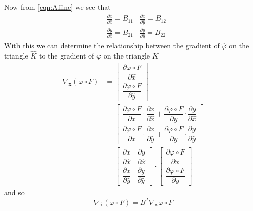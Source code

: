Now from \eqref{eqn:Affine} we see that 
\begin{align*}
  &\frac{\partial x}{\partial \hat{x}} = B_{11}   &\frac{\partial x}{\partial \hat{y}} = B_{12} \\
  &\frac{\partial y}{\partial \hat{x}} = B_{21}   &\frac{\partial y}{\partial \hat{y}} = B_{22}
\end{align*}
With this we can determine the relationship between the gradient of $\hat{\varphi}$ on the
triangle $\hat{K}$ to the gradient of $\varphi$ on the triangle $K$
\begin{align*}
  \nabla_{\mathbf{\hat{x}}}\left( \varphi \circ F \right) &= \begin{bmatrix}
    \dfrac{\partial \varphi\circ F}{\partial \hat{x}} \\[1em]
    \dfrac{\partial \varphi\circ F}{\partial \hat{y}}
  \end{bmatrix} \\
  &=\begin{bmatrix} 
    \dfrac{\partial \varphi\circ F}{\partial x} \cdot \dfrac{\partial x}{\partial \hat{x}} +
      \dfrac{\partial \varphi\circ F}{\partial y} \cdot \dfrac{\partial y}{\partial \hat{x}} \\[1em]
    \dfrac{\partial \varphi\circ F}{\partial x} \cdot \dfrac{\partial x}{\partial \hat{y}} +
      \dfrac{\partial \varphi\circ F}{\partial y} \cdot \dfrac{\partial y}{\partial \hat{y}} 
  \end{bmatrix} \\
  &= \begin{bmatrix}
    \dfrac{\partial x}{\partial \hat{x}} & \dfrac{\partial y}{\partial \hat{x}} \\[1em]
    \dfrac{\partial x}{\partial \hat{y}} & \dfrac{\partial y}{\partial \hat{y}} 
  \end{bmatrix}\cdot \begin{bmatrix}
    \dfrac{\partial \varphi\circ F}{\partial x} \\[1em] \dfrac{\partial \varphi\circ F}{\partial y} 
  \end{bmatrix}
\end{align*}
and so
\begin{equation}
  \nabla_{\mathbf{\hat{x}}}\left( \varphi \circ F \right) = B^T \nabla_{\mathbf{x}} \varphi \circ F
  \label{eqn:Gradient}
\end{equation}

